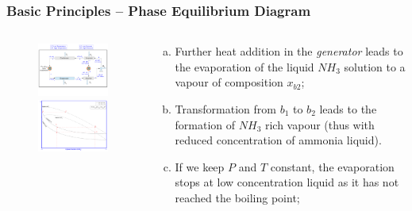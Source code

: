 \documentclass[10pt,compress]{beamer}
\begin{document}
\begin{frame}
 \frametitle{Basic Principles -- Phase Equilibrium Diagram} 
  \begin{columns}
   \begin{column}[c]{0.45\linewidth}
    \begin{figure}%
     \vbox{
      \includegraphics[width=4.5cm,height=4.cm,clip]{./Pics/Overview_Refrig32}
      \vspace{-.5cm}
      \includegraphics[width=4.5cm,height=4.cm,clip]{./Pics/Overview_Refrig34}}
    \end{figure}  
   \end{column}  
   \begin{column}[c]{0.55\linewidth}
    \begin{enumerate}[(a)]
     \item <1-> Further heat addition in the {\it generator} leads to the evaporation of the liquid $NH_{3}$ solution to a vapour of composition $x_{b2}$;
     \item <2-> Transformation from $b_{1}$ to $b_{2}$ leads to the formation of $NH_{3}$ rich vapour (thus with reduced concentration of ammonia liquid).
     \item <3-> If we keep $P$ and $T$ constant, the evaporation stops at low concentration liquid as it has not reached the boiling point;
   \end{enumerate}
  \end{column}  
 \end{columns}  
\end{frame}
\end{document}
